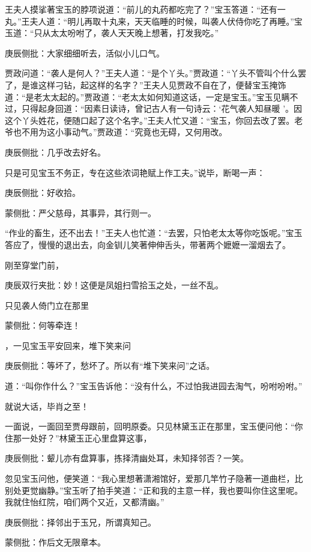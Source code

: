 \begin{parag}
    王夫人摸挲著宝玉的脖项说道：“前儿的丸药都吃完了？”宝玉答道：“还有一丸。”王夫人道：“明儿再取十丸来，天天临睡的时候，叫袭人伏侍你吃了再睡。”宝玉道：“只从太太吩咐了，袭人天天晚上想著，打发我吃。”\begin{note}庚辰侧批：大家细细听去，活似小儿口气。\end{note}贾政问道：“袭人是何人？”王夫人道：“是个丫头。”贾政道：“丫头不管叫个什么罢了，是谁这样刁钻，起这样的名字？”王夫人见贾政不自在了，便替宝玉掩饰道：“是老太太起的。”贾政道：“老太太如何知道这话，一定是宝玉。”宝玉见瞒不过，只得起身回道：“因素日读诗，曾记古人有一句诗云：‘花气袭人知昼暖 ’。因这个丫头姓花，便随口起了这个名字。”王夫人忙又道：“宝玉，你回去改了罢。老爷也不用为这小事动气。”贾政道：“究竟也无碍，又何用改。\begin{note}庚辰侧批：几乎改去好名。\end{note}只是可见宝玉不务正，专在这些浓词艳赋上作工夫。”说毕，断喝一声：\begin{note}庚辰侧批：好收拾。\end{note}\begin{note}蒙侧批：严父慈母，其事异，其行则一。\end{note}“作业的畜生，还不出去！”王夫人也忙道：“去罢，只怕老太太等你吃饭呢。”宝玉答应了，慢慢的退出去，向金钏儿笑著伸伸舌头，带著两个嬷嬷一溜烟去了。
\end{parag}


\begin{parag}
    刚至穿堂门前，\begin{note}庚辰双行夹批：妙！这便是凤姐扫雪拾玉之处，一丝不乱。\end{note}只见袭人倚门立在那里\begin{note}蒙侧批：何等牵连！\end{note}，一见宝玉平安回来，堆下笑来问\begin{note}庚辰侧批：等坏了，愁坏了。所以有“堆下笑来问”之话。\end{note}道：“叫你作什么？”宝玉告诉他：“没有什么，不过怕我进园去淘气，吩咐吩咐。”\begin{note}就说大话，毕肖之至！\end{note}一面说，一面回至贾母跟前，回明原委。只见林黛玉正在那里，宝玉便问他：“你住那一处好？”林黛玉正心里盘算这事，\begin{note}庚辰侧批：颦儿亦有盘算事，拣择清幽处耳，未知择邻否？一笑。\end{note}忽见宝玉问他，便笑道：“我心里想著潇湘馆好，爱那几竿竹子隐著一道曲栏，比别处更觉幽静。”宝玉听了拍手笑道：“正和我的主意一样，我也要叫你住这里呢。我就住怡红院，咱们两个又近，又都清幽。”\begin{note}庚辰侧批：择邻出于玉兄，所谓真知己。\end{note}\begin{note}蒙侧批：作后文无限章本。\end{note}
\end{parag}


